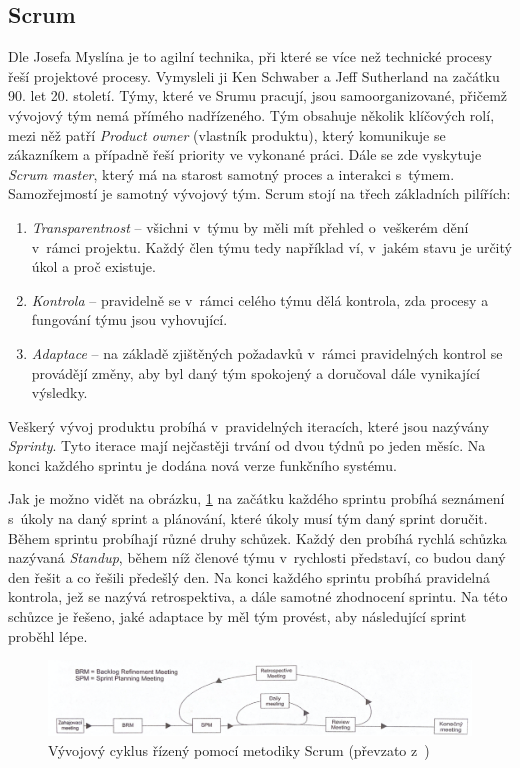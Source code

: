 \documentclass[czech,master]{diploma}
\begin{document}
\subsection{Scrum}
Dle Josefa Myslína \cite{ref:scrum_myslin} je to agilní technika, při které se více než technické procesy řeší projektové procesy. Vymysleli ji Ken Schwaber a Jeff Sutherland na začátku 90. let 20. století. Týmy, které ve Srumu pracují, jsou samoorganizované, přičemž vývojový tým nemá přímého nadřízeného. Tým obsahuje několik klíčových rolí, mezi něž patří \textit{Product owner} (vlastník produktu), který komunikuje se zákazníkem a případně řeší priority ve vykonané práci. Dále se zde vyskytuje \textit{Scrum master}, který má na starost samotný proces a interakci s~týmem. Samozřejmostí je samotný vývojový tým. Scrum stojí na třech základních pilířích:

\begin{enumerate}
\item \textit{Transparentnost} -- všichni v~týmu by měli mít přehled o~veškerém dění v~rámci projektu. Každý člen týmu tedy například ví, v~jakém stavu je určitý úkol a proč existuje.
\item \textit{Kontrola} -- pravidelně se v~rámci celého týmu dělá kontrola, zda procesy a fungování týmu jsou vyhovující.
\item \textit{Adaptace} -- na základě zjištěných požadavků v~rámci pravidelných kontrol se provádějí změny, aby byl daný tým spokojený a doručoval dále vynikající výsledky.
\end{enumerate}

Veškerý vývoj produktu probíhá v~pravidelných iteracích, které jsou nazývány \textit{Sprinty}. Tyto iterace mají nejčastěji trvání od dvou týdnů po jeden měsíc. Na konci každého sprintu je dodána nová verze funkčního systému.

Jak je možno vidět na obrázku, \ref{fig:scrum_cyklus} na začátku každého sprintu probíhá seznámení s~úkoly na daný sprint a plánování, které úkoly musí tým daný sprint doručit. Během sprintu probíhají různé druhy schůzek. Každý den probíhá rychlá schůzka nazývaná \textit{Standup}, během níž členové týmu v~rychlosti představí, co budou daný den řešit a co řešili předešlý den. Na konci každého sprintu probíhá pravidelná kontrola, jež se nazývá retrospektiva, a dále samotné zhodnocení sprintu. Na této schůzce je řešeno, jaké adaptace by měl tým provést, aby následující sprint proběhl lépe.

\begin{figure}[!ht]
    \centering
    \includegraphics[width=1\textwidth]{Diplomka/Figures/scrum.png}
    \caption{Vývojový cyklus řízený pomocí metodiky Scrum (převzato z~\cite{ref:scrum_myslin_cyklus_img})}
    \label{fig:scrum_cyklus}
\end{figure}
\end{document}
